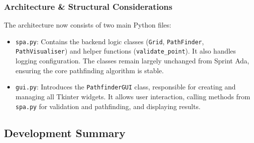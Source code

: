 \subsubsection{Architecture \& Structural Considerations}

The architecture now consists of two main Python files:
\begin{itemize}
	\item \verb|spa.py|: Contains the backend logic classes (\verb|Grid|, \verb|PathFinder|, \verb|PathVisualiser|) and helper functions (\verb|validate_point|). It also handles logging configuration. The classes remain largely unchanged from Sprint Ada, ensuring the core pathfinding algorithm is stable.
	\item \verb|gui.py|: Introduces the \verb|PathfinderGUI| class, responsible for creating and managing all Tkinter widgets. It allows user interaction, calling methods from \verb|spa.py| for validation and pathfinding, and displaying results.
\end{itemize}

\newpage

\subsection{Development Summary}


